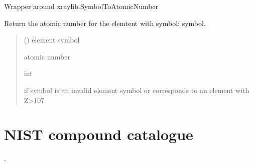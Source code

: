 \documentclass[letterpaper,10pt,english,openany,oneside]{sphinxmanual}
\begin{document}
\begin{fulllineitems}
\label{\detokenize{api/compound_parser:dxraylib.SymbolToAtomicNumber}}
\pysigstartsignatures
{}
\pysigstopsignatures
\sphinxAtStartPar
Wrapper around xraylib.SymbolToAtomicNumber

\sphinxAtStartPar
Return the atomic number for the elemtent with symbol: symbol.
\begin{quote}\begin{description}
\sphinxAtStartPar
{} () \textendash{} element symbol

\sphinxAtStartPar
atomic number

\sphinxAtStartPar
int

\sphinxAtStartPar
{} \textendash{} if symbol is an invalid element symbol or corresponds to an element
    with Z\textgreater{}107

\end{description}\end{quote}

\end{fulllineitems}


\sphinxstepscope


\section{NIST compound catalogue}
\label{\detokenize{api/nist:nist-compound-catalogue}}\label{\detokenize{api/nist::doc}}
\sphinxAtStartPar
{}.
\end{document}
